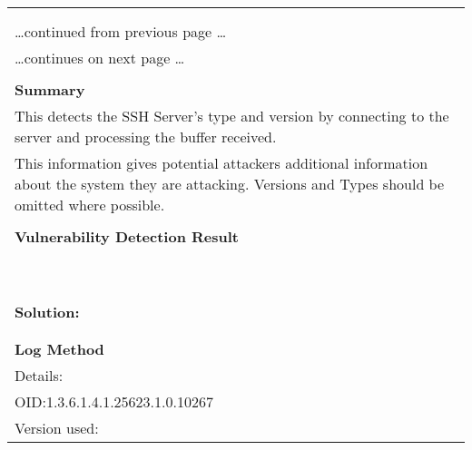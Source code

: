 \documentclass{article}
\begin{document}
\begin{longtable}{|p{}|}
\hline
\rowcolor{gvm_log}{\color{white}{Log (CVSS: 0.0) }}\\
\rowcolor{gvm_log}{\color{white}{NVT: SSH Server type and version}}\\
\hline
\endfirsthead
\hfill\ldots continued from previous page \ldots \\
\hline
\endhead
\hline
\ldots continues on next page \ldots \\
\endfoot
\hline
\endlastfoot
\\
\textbf{Summary}\\
This detects the SSH Server's type and version by connecting to the server
  and processing the buffer received.\\
  This information gives potential attackers additional information about the system they are attacking.
  Versions and Types should be omitted where possible.\\

        \hline
        \\
\textbf{Vulnerability Detection Result}\\
\rowcolor{white}{\verb=Remote SSH server banner: SSH-2.0-dropbear_2016.74=}\\
\rowcolor{white}{\verb=Remote SSH supported authentication: password,publickey=}\\
\rowcolor{white}{\verb=Remote SSH text/login banner: (not available)=}\\
\rowcolor{white}{\verb=This is probably:=}\\
\rowcolor{white}{\verb=- Dropbear SSH=}\\
\rowcolor{white}{\verb=Concluded from remote connection attempt with credentials:=}\\
\rowcolor{white}{\verb=Login:    OpenVASVT=}\\
\rowcolor{white}{\verb=Password: OpenVASVT=}\\

          \hline
          \\
\textbf{Solution:}\\
\\


        \hline
        \\
\textbf{Log Method}\\
Details:
\rowcolor{white}{\verb=SSH Server type and version=}\\
OID:1.3.6.1.4.1.25623.1.0.10267\\
Version used:
\rowcolor{white}{\verb=2021-09-28T06:32:28Z=}\\
\end{longtable}
\end{document}
